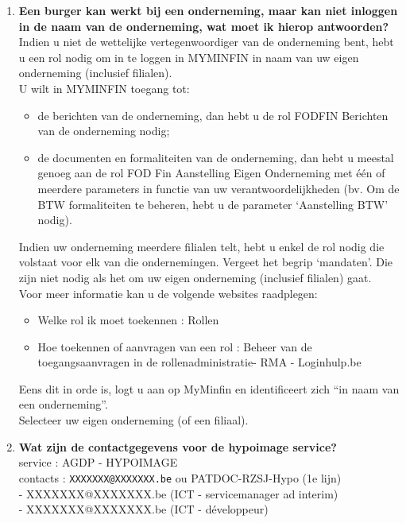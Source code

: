\begin{enumerate}
        \item \textbf{Een burger kan werkt bij een onderneming, maar kan niet inloggen in de naam van de onderneming, wat moet ik hierop antwoorden?} \\
        Indien u niet de wettelijke vertegenwoordiger van de onderneming bent, hebt u een rol nodig om in te loggen in MYMINFIN in naam van uw eigen onderneming (inclusief filialen).\\
        U wilt in MYMINFIN toegang tot:
        \begin{itemize}
            \item de berichten van de onderneming, dan hebt u de rol FODFIN Berichten van de onderneming nodig;
            \item de documenten en formaliteiten van de onderneming, dan hebt u meestal genoeg aan de rol FOD Fin Aanstelling Eigen Onderneming met één of meerdere parameters in functie van uw verantwoordelijkheden (bv. Om de BTW formaliteiten te beheren, hebt u de parameter ‘Aanstelling BTW' nodig).
            \end{itemize}
Indien uw onderneming meerdere filialen telt, hebt u enkel de rol nodig die volstaat voor elk van die ondernemingen. Vergeet het begrip ‘mandaten'. Die zijn niet nodig als het om uw eigen onderneming (inclusief filialen) gaat.\\
Voor meer informatie kan u de volgende websites raadplegen:
\begin{itemize}
\item Welke rol ik moet toekennen : Rollen
\item Hoe toekennen of aanvragen van een rol : Beheer van de toegangsaanvragen in de rollenadministratie- RMA - Loginhulp.be
\end{itemize}
Eens dit in orde is, logt u aan op MyMinfin en identificeert zich “in naam van een onderneming”.\\
Selecteer uw eigen onderneming (of een filiaal).

\item \textbf{Wat zijn de contactgegevens voor de hypoimage service?} \\
service : AGDP - HYPOIMAGE \\
contacts : \texttt{XXXXXXX@XXXXXXX.be} ou PATDOC-RZSJ-Hypo (1e lijn) \\
- XXXXXXX@XXXXXXX.be (ICT - servicemanager ad interim) \\
- XXXXXXX@XXXXXXX.be (ICT - développeur)
\end{enumerate}
